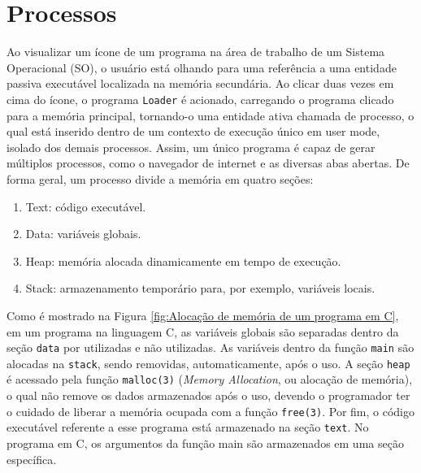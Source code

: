 



\hypertarget{processos}{%
\chapter{Processos}\label{processos}}

Ao visualizar um ícone de um programa na área de trabalho de um Sistema
Operacional (SO), o usuário está olhando para uma referência a uma
entidade passiva executável localizada na memória secundária. Ao clicar
duas vezes em cima do ícone, o programa \texttt{Loader} é acionado,
carregando o programa clicado para a memória principal, tornando-o uma
entidade ativa chamada de processo, o qual está inserido dentro de um
contexto de execução único em user mode, isolado dos demais processos.
Assim, um único programa é capaz de gerar múltiplos processos, como o
navegador de internet e as diversas abas abertas. De forma geral, um
processo divide a memória em quatro seções:

\begin{enumerate}
\def\labelenumi{\arabic{enumi}.}

\item
  Text: código executável.
\item
  Data: variáveis globais.
\item
  Heap: memória alocada dinamicamente em tempo de execução.
\item
  Stack: armazenamento temporário para, por exemplo, variáveis locais.
\end{enumerate}

Como é mostrado na Figura \ref{fig:Alocação de memória de um programa em C}, em um programa na linguagem C, as variáveis globais são separadas dentro da
seção \texttt{data} por utilizadas e não utilizadas. As variáveis dentro
da função \texttt{main} são alocadas na \texttt{stack}, sendo removidas,
automaticamente, após o uso. A seção \texttt{heap} é acessado pela
função \texttt{malloc(3)} (\emph{Memory Allocation}, ou alocação de
memória), o qual não remove os dados armazenados após o uso, devendo o
programador ter o cuidado de liberar a memória ocupada com a função
\texttt{free(3)}. Por fim, o código executável referente a esse programa
está armazenado na seção \texttt{text}. No programa em C, os argumentos
da função main são armazenados em uma seção específica.


